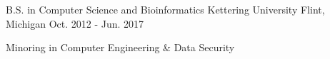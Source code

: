 

\begin{cventries}



  \cventry
    {B.S. in Computer Science and Bioinformatics } %
    {Kettering University} %
    {Flint, Michigan} %
    {Oct. 2012 - Jun. 2017} %
    {
      \begin{cvitems} %
        \item {Minoring in Computer Engineering \& Data Security}
      \end{cvitems}
    }

\end{cventries}
